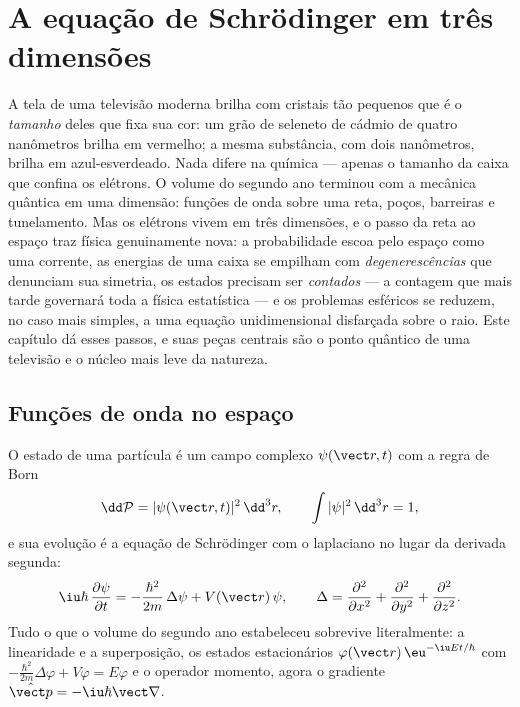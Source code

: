 \chapter{A equação de Schrödinger em três dimensões}\label{ch:b3:schrodinger-three-dimensions}

A tela de uma televisão moderna brilha com cristais tão pequenos que é
o \emph{tamanho} deles que fixa sua cor: um grão de seleneto de cádmio
de quatro nanômetros brilha em vermelho; a mesma substância, com dois
nanômetros, brilha em azul-esverdeado. Nada difere na química ---
apenas o tamanho da caixa que confina os elétrons. O volume do segundo
ano terminou com a mecânica quântica em uma dimensão: funções de onda
sobre uma reta, poços, barreiras e tunelamento. Mas os elétrons vivem
em três dimensões, e o passo da reta ao espaço traz física
genuinamente nova: a probabilidade escoa pelo espaço como uma corrente,
as energias de uma caixa se empilham com \emph{degenerescências} que
denunciam sua simetria, os estados precisam ser \emph{contados} --- a
contagem que mais tarde governará toda a física estatística --- e os
problemas esféricos se reduzem, no caso mais simples, a uma equação
unidimensional disfarçada sobre o raio. Este capítulo dá esses passos,
e suas peças centrais são o ponto quântico de uma televisão e o núcleo
mais leve da natureza.

\section{Funções de onda no espaço}

\begin{definition}\label{def:b3:schrodinger-three-dimensions:psi3d}
O estado de uma partícula é um campo complexo $\psi(\vect r, t)$ com a
regra de Born
\[
\dd\mathcal P = |\psi(\vect r, t)|^2\,\dd^3r , \qquad
\int|\psi|^2\,\dd^3r = 1 ,
\]
e sua evolução é a equação de Schrödinger com o laplaciano no lugar da
derivada segunda:
\[
\iu\hbar\,\frac{\partial\psi}{\partial t}
 = -\frac{\hbar^2}{2m}\,\Delta\psi + V(\vect r)\,\psi ,
\qquad
\Delta = \frac{\partial^2}{\partial x^2} +
\frac{\partial^2}{\partial y^2} + \frac{\partial^2}{\partial z^2} .
\]
Tudo o que o volume do segundo ano estabeleceu sobrevive literalmente:
a linearidade e a superposição, os estados estacionários
$\varphi(\vect r)\,\eu^{-\iu Et/\hbar}$ com
$-\tfrac{\hbar^2}{2m}\Delta\varphi + V\varphi = E\varphi$ e o operador
momento, agora o gradiente $\hat{\vect p} =
-\iu\hbar\vect\nabla$.
\end{definition}

